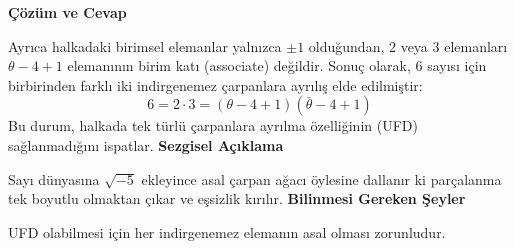\documentclass[11pt, a4paper]{article}
\newenvironment{cozum}{
    \vspace{0.5cm}
    \noindent\textcolor{green!60!black}{\faCheckCircle\enspace \textbf{\Large Çözüm ve Cevap}}\par\vspace{0.2cm}
}{}
\newenvironment{sezgisel}{
    \vspace{0.5cm}
    \noindent\textcolor{orange!80!black}{\faLightbulb\enspace \textbf{\Large Sezgisel Açıklama}}\par\vspace{0.2cm}
    \itshape
}{}
\newenvironment{bilgi}{
    \vspace{0.5cm}
    \noindent\textcolor{red!70!black}{\faExclamationTriangle\enspace \textbf{\Large Bilinmesi Gereken Şeyler}}\par\vspace{0.2cm}
}{}
\begin{document}
\begin{cozum}
Ayrıca halkadaki birimsel elemanlar yalnızca $\pm 1$ olduğundan, $2$ veya $3$ elemanları $\theta - 4 + 1$ elemanının birim katı (associate) değildir. Sonuç olarak, $6$ sayısı için birbirinden farklı iki indirgenemez çarpanlara ayrılış elde edilmiştir:
\[ 6 = 2 \cdot 3 = (\theta - 4 + 1)(\bar{\theta} - 4 + 1) \]
Bu durum, halkada tek türlü çarpanlara ayrılma özelliğinin (UFD) sağlanmadığını ispatlar.
\end{cozum}
\begin{sezgisel}
Sayı dünyasına $\sqrt{-5}$ ekleyince asal çarpan ağacı öylesine dallanır ki parçalanma tek boyutlu olmaktan çıkar ve eşsizlik kırılır.
\end{sezgisel}
\begin{bilgi}
UFD olabilmesi için her indirgenemez elemanın asal olması zorunludur.
\end{bilgi}

\newpage
\end{document}

